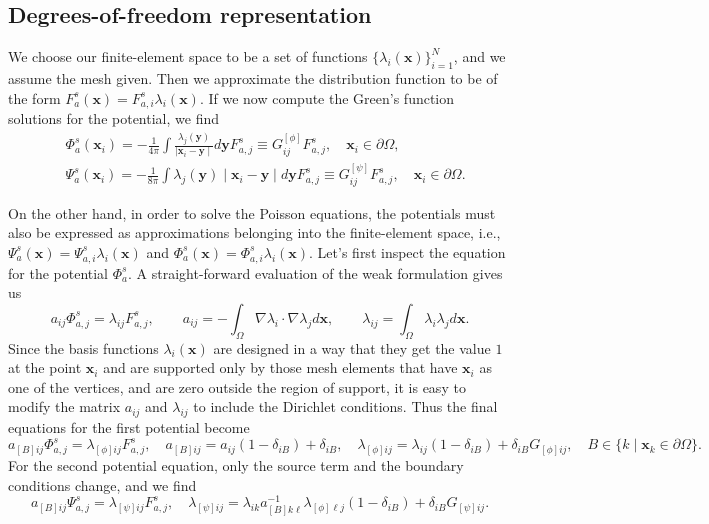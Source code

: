 \documentclass[preprint]{revtex4}
\begin{document}
\subsection{Degrees-of-freedom representation}
We choose our finite-element space to be a set of functions $\{\lambda_i(\bm{x})\}_{i=1}^{N}$, and we assume the mesh given. Then we approximate the distribution function to be of the form $F^s_a(\bm{x})=F^s_{a,i}\lambda_i(\bm{x})$. If we now compute the Green's function solutions for the potential, we find
\begin{align}
&\Phi_a^s(\bm{x}_i)=-\frac{1}{4\pi}\int \frac{\lambda_j(\bm{y})}{\mid \bm{x}_i-\bm{y}\mid}d\bm{y}F_{a,j}^s\equiv G^{[\phi]}_{ij}F_{a,j}^s, \quad \bm{x}_i\in\partial\Omega,\\
&\Psi_a^s(\bm{x}_i)=-\frac{1}{8\pi}\int \lambda_j(\bm{y})\mid \bm{x}_i-\bm{y}\mid d\bm{y}F_{a,j}^s\equiv G^{[\psi]}_{ij}F_{a,j}^s, \quad \bm{x}_i\in\partial\Omega.
\end{align}

On the other hand, in order to solve the Poisson equations, the potentials must also be expressed as approximations belonging into the finite-element space, i.e., $\Psi^s_a(\bm{x})=\Psi^s_{a,i}\lambda_i(\bm{x})$ and $\Phi^s_a(\bm{x})=\Phi^s_{a,i}\lambda_i(\bm{x})$. Let's first inspect the equation for the potential $\Phi^s_a$. A straight-forward evaluation of the weak formulation gives us
\begin{equation}
a_{ij}\Phi^s_{a,j}=\lambda_{ij}F^s_{a,j},\qquad a_{ij}=-\int_\Omega\nabla\lambda_i\cdot\nabla\lambda_jd\bm{x},\qquad \lambda_{ij}=\int_\Omega\lambda_i\lambda_jd\bm{x}.
\end{equation}
Since the basis functions $\lambda_i(\bm{x})$ are designed in a way that they get the value $1$ at the point $\bm{x}_i$ and are supported only by those mesh elements that have $\bm{x}_i$ as one of the vertices, and are zero outside the region of support, it is easy to modify the matrix $a_{ij}$ and $\lambda_{ij}$ to include the Dirichlet conditions. Thus the final equations for the first potential become
\begin{equation}
a_{[B]ij}\Phi^s_{a,j}=\lambda_{[\phi]ij}F^s_{a,j},\quad a_{[B]ij}=a_{ij}\left(1-\delta_{iB}\right) + \delta_{iB},\quad \lambda_{[\phi]ij}=\lambda_{ij}\left(1-\delta_{iB}\right) + \delta_{iB}G_{[\phi]ij},\quad B\in\{k\mid\bm{x}_k\in\partial\Omega\}.
\end{equation}
For the second potential equation, only the source term and the boundary conditions change, and we find
\begin{equation}
a_{[B]ij}\Psi^s_{a,j}=\lambda_{[\psi]ij}F^s_{a,j},\quad \lambda_{[\psi]ij}=\lambda_{ik}a_{[B]k\ell}^{-1}\lambda_{[\phi]\ell j}(1-\delta_{iB})+\delta_{iB}G_{[\psi]ij}.
\end{equation}
\end{document}
